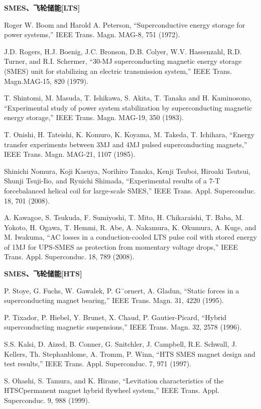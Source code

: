 \noindent \textbf{SMES、飞轮储能[LTS] }

\noindent [9.75] Roger W. Boom and Harold A. Peterson, ``Superconductive energy storage for
power systems,” IEEE Trans. Magn. MAG-8, 751 (1972).

\noindent [9.76] J.D. Rogers, H.J. Boenig, J.C. Bronson, D.B. Colyer, W.V. Hassenzahl, R.D. Turner, and R.I. Schermer, ``30-MJ superconducting magnetic energy storage (SMES)
unit for stabilizing an electric transmission system,” IEEE Trans. Magn.MAG-15,
820 (1979).

\noindent [9.77] T. Shintomi, M. Masuda, T. Ishikawa, S. Akita, T. Tanaka and H. Kaminosono,
``Experimental study of power system stabilization by superconducting magnetic
energy storage,” IEEE Trans. Magn. MAG-19, 350 (1983).

\noindent [9.78] T. Onishi, H. Tateishi, K. Komuro, K. Koyama, M. Takeda, T. Ichihara, ``Energy
transfer experiments between 3MJ and 4MJ pulsed superconducting magnets,”
IEEE Trans. Magn. MAG-21, 1107 (1985).

\noindent [9.79] Shinichi Nomura, Koji Kasuya, Norihiro Tanaka, Kenji Tsuboi, Hiroaki Tsutsui,
Shunji Tsuji-Iio, and Ryuichi Shimada, ``Experimental results of a 7-T forcebalanced
helical coil for large-scale SMES,” IEEE Trans. Appl. Superconduc. 18,
701 (2008).

\noindent [9.80] A. Kawagoe, S. Tsukuda, F. Sumiyoshi, T. Mito, H. Chikaraishi, T. Baba, M. Yokoto,
H. Ogawa, T. Hemmi, R. Abe, A. Nakamura, K. Okumura, A. Kuge, and M.
Iwakuma, ``AC losses in a conduction-cooled LTS pulse coil with stored energy of
1MJ for UPS-SMES as protection from momentary voltage drops,” IEEE Trans.
Appl. Superconduc. 18, 789 (2008).

\noindent \textbf{SMES、飞轮储能[HTS] }

\noindent [9.81] P. Stoye, G. Fuchs, W. Gawalek, P. G¨ornert, A. Gladun, ``Static forces in a superconducting
magnet bearing,” IEEE Trans. Magn. 31, 4220 (1995).

\noindent [9.82] P. Tixador, P. Hiebel, Y. Brunet, X. Chaud, P. Gautier-Picard, ``Hybrid superconducting
magnetic suspensions,” IEEE Trans. Magn. 32, 2578 (1996).

\noindent [9.83] S.S. Kalsi, D. Aized, B. Conner, G. Snitchler, J. Campbell, R.E. Schwall, J. Kellers,
Th. Stephanblome, A. Tromm, P. Winn, ``HTS SMES magnet design and test
results,” IEEE Trans. Appl. Superconduc. 7, 971 (1997).

\noindent [9.84] S. Ohashi, S. Tamura, and K. Hirane, ``Levitation characteristics of the HTSCpermanent
magnet hybrid flywheel system,” IEEE Trans. Appl. Superconduc. 9,
988 (1999).

